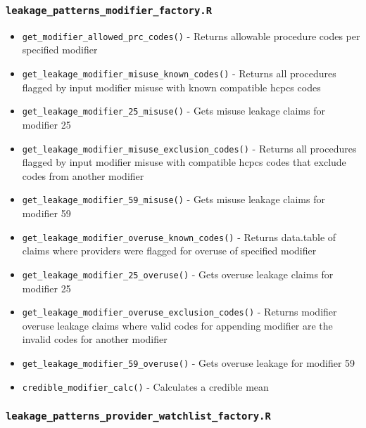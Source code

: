 \documentclass[
]{book}
\providecommand{\tightlist}{%
  \setlength{\itemsep}{0pt}\setlength{\parskip}{0pt}}
\begin{document}
\hypertarget{leakage_patterns_modifier_factory.r}{%
\subsubsection{\texorpdfstring{\texttt{leakage\_patterns\_modifier\_factory.R}}{leakage\_patterns\_modifier\_factory.R}}\label{leakage_patterns_modifier_factory.r}}

\begin{itemize}
\tightlist
\item
  \texttt{get\_modifier\_allowed\_prc\_codes()} - Returns allowable procedure codes per specified modifier
\item
  \texttt{get\_leakage\_modifier\_misuse\_known\_codes()} - Returns all procedures flagged by input modifier misuse with known compatible hcpcs codes
\item
  \texttt{get\_leakage\_modifier\_25\_misuse()} - Gets misuse leakage claims for modifier 25
\item
  \texttt{get\_leakage\_modifier\_misuse\_exclusion\_codes()} - Returns all procedures flagged by input modifier misuse with compatible hcpcs codes that exclude codes from another modifier
\item
  \texttt{get\_leakage\_modifier\_59\_misuse()} - Gets misuse leakage claims for modifier 59
\item
  \texttt{get\_leakage\_modifier\_overuse\_known\_codes()} - Returns data.table of claims where providers were flagged for overuse of specified modifier
\item
  \texttt{get\_leakage\_modifier\_25\_overuse()} - Gets overuse leakage claims for modifier 25
\item
  \texttt{get\_leakage\_modifier\_overuse\_exclusion\_codes()} - Returns modifier overuse leakage claims where valid codes for appending modifier are the invalid codes for another modifier
\item
  \texttt{get\_leakage\_modifier\_59\_overuse()} - Gets overuse leakage for modifier 59
\item
  \texttt{credible\_modifier\_calc()} - Calculates a credible mean
\end{itemize}

\hypertarget{leakage_patterns_provider_watchlist_factory.r}{%
\subsubsection{\texorpdfstring{\texttt{leakage\_patterns\_provider\_watchlist\_factory.R}}{leakage\_patterns\_provider\_watchlist\_factory.R}}\label{leakage_patterns_provider_watchlist_factory.r}}
\end{document}
